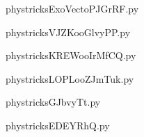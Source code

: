     \newcommand{\CaptionFigExoVectoPJGrRF}{<+Type your caption here+>}
    \begin{center}
        
    \end{center}
    phystricksExoVectoPJGrRF.py

    

    \clearpage
    


    \newcommand{\CaptionFigVJZKooGlvyPP}{<+Type your caption here+>}
    \begin{center}
        
    \end{center}
    phystricksVJZKooGlvyPP.py

    

    \clearpage
    


    \newcommand{\CaptionFigKREWooIrMfCQ}{<+Type your caption here+>}
    \begin{center}
        
    \end{center}
    phystricksKREWooIrMfCQ.py

    

    \clearpage
    


    \newcommand{\CaptionFigLOPLooZJmTuk}{<+Type your caption here+>}
    \begin{center}
        
    \end{center}
    phystricksLOPLooZJmTuk.py

    

    \clearpage
    


    \newcommand{\CaptionFigGJbvyTt}{<+Type your caption here+>}
    \begin{center}
        
    \end{center}
    phystricksGJbvyTt.py

    

    \clearpage
    


    \newcommand{\CaptionFigEDEYRhQ}{<+Type your caption here+>}
    \begin{center}
        
    \end{center}
    phystricksEDEYRhQ.py

